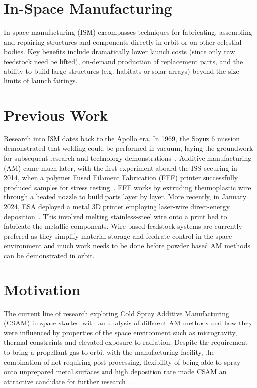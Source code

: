 \section{In-Space Manufacturing}
In-space manufacturing (ISM) encompasses techniques for fabricating, assembling and repairing structures and components directly in orbit or on other celestial bodies. Key benefits include dramatically lower launch costs (since only raw feedstock need be lifted), on-demand production of replacement parts, and the ability to build large structures (e.g. habitats or solar arrays) beyond the size limits of launch fairings.

\section{Previous Work}
Research into ISM dates back to the Apollo era. In 1969, the Soyuz 6 mission demonstrated that welding could be performed in vacuum, laying the groundwork for subsequent research and technology demonstrations~\cite{nasa1984welding}. Additive manufacturing (AM) came much later, with the first experiment aboard the ISS occuring in 2014, when a polymer Fused Filament Fabrication (FFF) printer successfully produced samples for stress testing~\cite{Prater2019}. FFF works by extruding thermoplastic wire through a heated nozzle to build parts layer by layer. More recently, in January 2024, ESA deployed a metal 3D printer employing laser-wire direct-energy deposition~\cite{ESA2024Metal3DPrinter}. This involved melting stainless-steel wire onto a print bed to fabricate the metallic components. Wire-based feedstock systems are currently prefered as they simplify material storage and feedrate control in the space environment and much work needs to be done before powder based AM methods can be demonstrated in orbit.

\section{Motivation}
The current line of research exploring Cold Spray Additive Manufacturing (CSAM) in space started with an analysis of different AM methods and how they were influenced by properties of the space environment such as microgravity, thermal constraints and elevated exposure to radiation. Despite the requirement to bring a propellant gas to orbit with the manufacturing facility, the combination of not requiring post processing, flexibility of being able to spray onto unprepared metal surfaces and high deposition rate made CSAM an attractive candidate for further research~\cite{malagowski2019amspace}.

